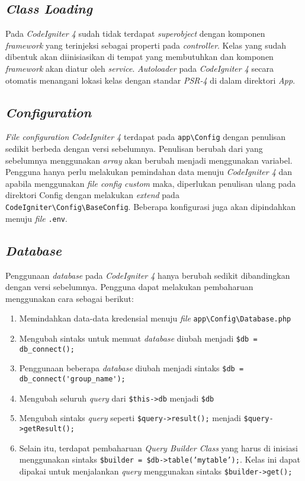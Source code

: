 \subsection{\textit{Class Loading}}
Pada \textit{CodeIgniter 4} sudah tidak terdapat \textit{superobject} dengan komponen \textit{framework} yang terinjeksi sebagai properti pada \textit{controller}. Kelas yang sudah dibentuk akan diinisiasikan di tempat yang membutuhkan dan komponen \textit{framework} akan diatur oleh \textit{service}. \textit{Autoloader} pada \textit{CodeIgniter 4} secara otomatis menangani lokasi kelas dengan standar \textit{PSR-4} di dalam direktori \textit{App}.
 
\subsection{\textit{Configuration}}

\textit{File configuration} \textit{CodeIgniter 4} terdapat pada \verb|app\Config| dengan penulisan sedikit berbeda dengan versi sebelumnya. Penulisan berubah dari yang sebelumnya menggunakan \textit{array} akan berubah menjadi menggunakan variabel. Pengguna hanya perlu melakukan pemindahan data menuju \textit{CodeIgniter 4} dan apabila menggunakan \textit{file config custom} maka, diperlukan penulisan ulang pada direktori Config dengan melakukan \textit{extend} pada \verb|CodeIgniter\Config\BaseConfig|. Beberapa konfigurasi juga akan dipindahkan menuju \textit{file} \texttt{.env}.

\subsection{\textit{Database}}

Penggunaan \textit{database} pada \textit{CodeIgniter 4} hanya berubah sedikit dibandingkan dengan versi sebelumnya. Pengguna dapat melakukan pembaharuan menggunakan cara sebagai berikut:
\begin{enumerate}
	\item Memindahkan data-data kredensial menuju \textit{file} \verb|app\Config\Database.php|
	\item Mengubah sintaks untuk memuat \textit{database} diubah menjadi \verb|$db = db_connect();|
	\item Penggunaan beberapa \textit{database} diubah menjadi sintaks \verb|$db = db_connect('group_name');|
	\item Mengubah seluruh \textit{query} dari \verb|$this->db| menjadi \verb|$db|
	\item Mengubah sintaks \textit{query} seperti \verb|$query->result();| menjadi \verb|$query->getResult();|
	\item Selain itu, terdapat pembaharuan \textit{Query Builder Class} yang harus di inisiasi menggunakan sintaks \texttt{\$builder = \$db->table('mytable');}. Kelas ini dapat dipakai untuk menjalankan \textit{query} menggunakan sintaks \verb|$builder->get();|
\end{enumerate}


